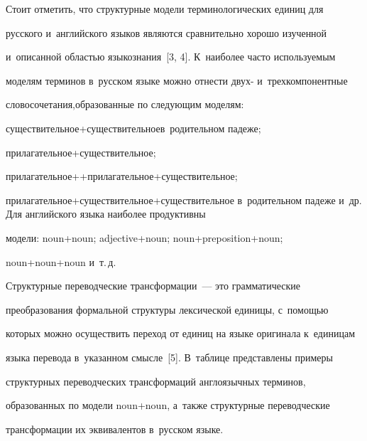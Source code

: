   Стоит отметить, что структурные модели терминологических единиц для 


русского и~английского языков являются сравнительно хорошо изученной 


и~описанной областью языкознания~[3, 4]. К~наиболее часто используемым 


моделям терминов в~русском языке можно отнести двух- и~трехкомпонентные 


словосочетания,\linebreak образованные по следующим моделям:  


су\-щест\-ви\-тель\-ное\;+\;су\-щест\-ви\-тель\-ное\linebreak в~родительном падеже;  


при\-ла\-га\-тель\-ное\;+\;су\-щест\-ви\-тель\-ное;  


при\-ла\-га\-тель\-ное\;+\linebreak +\;\;при\-ла\-га\-тель\-ное\;+\;су\-щест\-ви\-тель\-ное;  


при\-ла\-га\-тель\-ное\;+\;су\-щест\-ви\-тель\-ное\;+\;су\-щест\-ви\-тель\-ное в~родительном падеже и~др. Для английского языка наиболее продуктивны 


модели: noun\;+\;noun; adjective\;+\;noun; noun\;+\;preposition\;+\;noun;  


noun\;+\;noun\;+\;noun и~т.\,д.


  


  Структурные переводческие трансформации~--- это грамматические 


преобразования формальной структуры лексической единицы, с~по\-мощью 


которых можно осуществить переход от единиц на языке оригинала к~единицам 


языка перевода в~указанном смысле~[5]. В~таблице пред\-став\-ле\-ны примеры 


структурных переводческих трансформаций англоязычных терминов, 


образованных по модели noun\;+\;noun, а~также структурные переводческие 


трансформации их эквивалентов в~русском языке.





